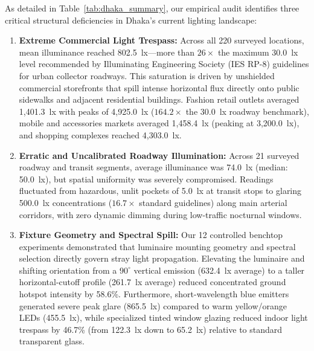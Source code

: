 \documentclass[11pt,a4paper]{article}
\begin{document}
As detailed in Table~\ref{tab:dhaka_summary}, our empirical audit identifies three critical structural deficiencies in Dhaka's current lighting landscape:
\begin{enumerate}
    \item \textbf{Extreme Commercial Light Trespass:} Across all 220 surveyed locations, mean illuminance reached 802.5~lx---more than \(26\times\) the maximum 30.0~lx level recommended by Illuminating Engineering Society (IES RP-8) guidelines \cite{ies_rp8} for urban collector roadways. This saturation is driven by unshielded commercial storefronts that spill intense horizontal flux directly onto public sidewalks and adjacent residential buildings. Fashion retail outlets averaged 1,401.3~lx with peaks of 4,925.0~lx (\(164.2\times\) the 30.0~lx roadway benchmark), mobile and accessories markets averaged 1,458.4~lx (peaking at 3,200.0~lx), and shopping complexes reached 4,303.0~lx.
    \item \textbf{Erratic and Uncalibrated Roadway Illumination:} Across 21 surveyed roadway and transit segments, average illuminance was 74.0~lx (median: 50.0~lx), but spatial uniformity was severely compromised. Readings fluctuated from hazardous, unlit pockets of 5.0~lx at transit stops to glaring 500.0~lx concentrations (\(16.7\times\) standard guidelines) along main arterial corridors, with zero dynamic dimming during low-traffic nocturnal windows.
    \item \textbf{Fixture Geometry and Spectral Spill:} Our 12 controlled benchtop experiments demonstrated that luminaire mounting geometry and spectral selection directly govern stray light propagation. Elevating the luminaire and shifting orientation from a \(90^\circ\) vertical emission (632.4~lx average) to a taller horizontal-cutoff profile (261.7~lx average) reduced concentrated ground hotspot intensity by 58.6\%. Furthermore, short-wavelength blue emitters generated severe peak glare (865.5~lx) compared to warm yellow/orange LEDs (455.5~lx), while specialized tinted window glazing reduced indoor light trespass by 46.7\% (from 122.3~lx down to 65.2~lx) relative to standard transparent glass.
\end{enumerate}
\end{document}
